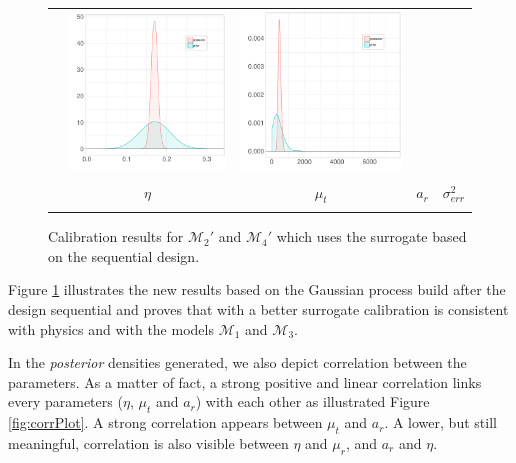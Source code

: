 \documentclass[soumission]{jsfds}
\begin{document}
\begin{figure}[htbp!]
\begin{center}
\begin{tabular}{ccccc}
    &  \includegraphics[width=.2\textwidth]{new/Model4sd/ar.pdf}
	&  \includegraphics[width=.2\textwidth]{new/Model4sd/Serr.pdf}\\
		 & $\eta$ & $\mu_t$ & $a_r$ & $\sigma_{err}^2$\\
	&&&&\\
  \end{tabular}
\caption{Calibration results for $\mathcal{M}_2'$ and $\mathcal{M}_4'$ which uses the surrogate based on the sequential design.}
\label{fig:calibrationSeq}
\end{center}
\end{figure}

Figure \ref{fig:calibrationSeq} illustrates the new results based on the Gaussian process build after the design sequential and proves that with a better surrogate calibration is consistent with physics and with the models $\mathcal{M}_1$ and $\mathcal{M}_3$.\newline


In the \textit{posterior} densities generated, we also depict correlation between the parameters. As a matter of fact, a strong positive and linear correlation links every parameters ($\eta$, $\mu_t$ and $a_r$) with each other as illustrated Figure \ref{fig:corrPlot}. A strong correlation appears between $\mu_t$ and $a_r$. A lower, but still meaningful, correlation is also visible between $\eta$ and $\mu_r$, and $a_r$ and $\eta$.\newline
\end{document}
